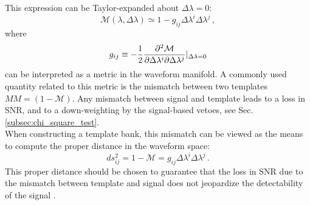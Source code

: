 \documentclass[binding=0.6cm, LaM]{sapthesis}
\begin{document}
	This expression can be Taylor-expanded about $\Delta \lambda = 0$:
		\begin{equation}
			\mathcal{M}(\lambda, \Delta \lambda) \simeq 1 - g_{ij} \Delta \lambda^i \Delta \lambda^j\,,
		\end{equation}
	where 
		\begin{equation}
			 g_{ij} \equiv -{1 \over 2} {{\partial^2\mathcal{M}} \over {\partial  \Delta \lambda^i  \partial \Delta \lambda^j}}\vert_{\Delta \lambda = 0}
		\end{equation}
	can be interpreted as a metric in the waveform manifold.  A commonly used quantity related to this metric
	is the mismatch between two templates $MM = (1 − \mathcal{M})$.
	Any mismatch between signal and template leads to a loss in SNR, 
	and to a down-weighting by the signal-based vetoes, see Sec.\,\ref{subsec:chi_square_test}. \\
	When constructing a template bank, this mismatch can be viewed as the means
	to compute the proper distance in the waveform space:
		\begin{equation}
			ds_{ij}^2 = 1 − \mathcal{M} = g_{ij} \Delta \lambda^i \Delta \lambda^j\,.
		\end{equation}
	This proper distance should be chosen to guarantee that the loss in SNR due to the mismatch 
	between template and signal does not jeopardize the detectability of the signal \cite{30}.
\end{document}
